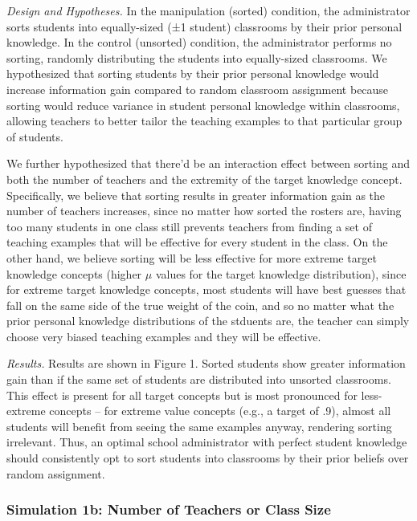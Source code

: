\documentclass[10pt, letterpaper]{apa6}
\begin{document}
\emph{Design and Hypotheses. } In the manipulation (sorted) condition,
the administrator sorts students into equally-sized (±1 student)
classrooms by their prior personal knowledge. In the control (unsorted)
condition, the administrator performs no sorting, randomly distributing
the students into equally-sized classrooms. We hypothesized that sorting
students by their prior personal knowledge would increase information
gain compared to random classroom assignment because sorting would
reduce variance in student personal knowledge within classrooms,
allowing teachers to better tailor the teaching examples to that
particular group of students.

We further hypothesized that there'd be an interaction effect between
sorting and both the number of teachers and the extremity of the target
knowledge concept. Specifically, we believe that sorting results in
greater information gain as the number of teachers increases, since no
matter how sorted the rosters are, having too many students in one class
still prevents teachers from finding a set of teaching examples that
will be effective for every student in the class. On the other hand, we
believe sorting will be less effective for more extreme target knowledge
concepts (higher \(\mu\) values for the target knowledge distribution),
since for extreme target knowledge concepts, most students will have
best guesses that fall on the same side of the true weight of the coin,
and so no matter what the prior personal knowledge distributions of the
stduents are, the teacher can simply choose very biased teaching
examples and they will be effective.

\emph{Results. } Results are shown in Figure 1. Sorted students show
greater information gain than if the same set of students are
distributed into unsorted classrooms. This effect is present for all
target concepts but is most pronounced for less-extreme concepts -- for
extreme value concepts (e.g., a target of .9), almost all students will
benefit from seeing the same examples anyway, rendering sorting
irrelevant. Thus, an optimal school administrator with perfect student
knowledge should consistently opt to sort students into classrooms by
their prior beliefs over random assignment.

\subsubsection{Simulation 1b: Number of Teachers or Class
Size}\label{simulation-1b-number-of-teachers-or-class-size}
\end{document}
